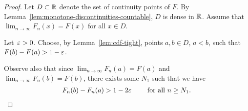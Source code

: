 \begin{proof}
  Let $D \subset \mathbb{R}$ denote the set of continuity points of $F$. By
  Lemma~\ref{lem:monotone-discontinuities-countable}, $D$ is dense in $\mathbb{R}$.
  Assume that $\lim_{n \to \infty} F_n(x) = F(x)$ for all $x \in D$.

  Let~$\varepsilon > 0$. Choose, by Lemma~\ref{lem:cdf-tight}, points
  $a,b \in D$, $a<b$, such that $F(b) - F(a) > 1 - \varepsilon$.

  Observe also that since $\lim_{n \to \infty} F_n(a) = F(a)$
  and $\lim_{n \to \infty} F_n(b) = F(b)$, there exists some $N_1$ such that
  we have
  \begin{align*}
  F_n(b) - F_n(a) > 1 - 2\varepsilon \qquad \text{ for all } n \geq N_1 .
  \end{align*}


\end{proof}
